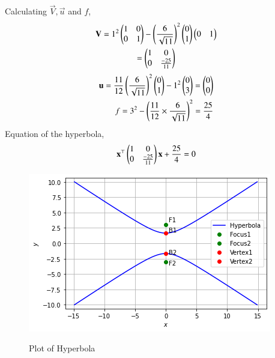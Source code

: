 \documentclass[journal,12pt,twocolumn]{IEEEtran}
\begin{document}
Calculating $\vec{V}, \vec{u}$ and $f$,
\begin{multline}
    \mathbf{V} = 1^2\begin{pmatrix}1&0\\0&1\end{pmatrix} - \left(\frac{6}{\sqrt{11}}\right)^2\begin{pmatrix}0\\1\end{pmatrix}\begin{pmatrix}0&1\end{pmatrix}\\
    = \begin{pmatrix}1&0\\0&\frac{-25}{11}\end{pmatrix}
\end{multline}
\begin{align}
    \mathbf{u} = \frac{11}{12}\left(\frac{6}{\sqrt{11}}\right)^2\begin{pmatrix}0\\1\end{pmatrix} - 1^2\begin{pmatrix}0\\3\end{pmatrix}=\begin{pmatrix}0\\0\end{pmatrix}\\
    f = 3^2 - \left(\frac{11}{12}\times\frac{6}{\sqrt{11}}\right)^2 = \frac{25}{4}
\end{align}
Equation of the hyperbola,
\begin{align}
    \mathbf{x}^{\top}\begin{pmatrix}1&0\\0&\frac{-25}{11}\end{pmatrix}\mathbf{x}+\frac{25}{4}=0
\end{align}
\begin{figure}[h!]
\centering
\includegraphics[width=\columnwidth]{hyperbola_plot.png}
\label{fig:hyperbola}
\caption{Plot of Hyperbola}
\end{figure}
\end{document}
